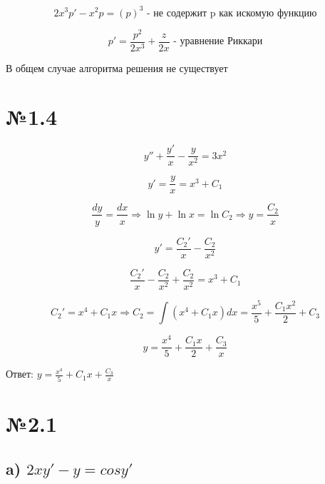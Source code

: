 \documentclass{article}
\begin{document}
\begin{equation*}
    2x^3p' - x^2p = (p)^3 \text{ - не содержит p как искомую функцию}
\end{equation*}

\begin{equation*}
    p' = \frac{p^2}{2x^3} + \frac{z}{2x} \text{ - уравнение Риккари}
\end{equation*}

В общем случае алгоритма решения не существует

\section*{№1.4}

\begin{equation*}
    y'' + \frac{y'}{x} - \frac{y}{x^2} = 3x^2
\end{equation*}

\begin{equation*}
    y' = \frac{y}{x} = x^3 + C_1
\end{equation*}

\begin{equation*}
    \frac{dy}{y} = \frac{dx}{x} \Rightarrow \ln{y} + \ln{x} = \ln{C_2} \Rightarrow y = \frac{C_2}{x}
\end{equation*}

\begin{equation*}
    y' = \frac{C_2'}{x} - \frac{C_2}{x^2}
\end{equation*}

\begin{equation*}
    \frac{C_2'}{x} - \frac{C_2}{x^2} + \frac{C_2}{x^2} = x^3 + C_1
\end{equation*}

\begin{equation*}
    C_2' = x^4 + C_1x \Rightarrow  C_2 = \int{(x^4 + C_1x)dx} = \frac{x^5}{5} + \frac{C_1x^2}{2} + C_3
\end{equation*}

\begin{equation*}
    y = \frac{x^4}{5} + \frac{C_1x}{2} + \frac{C_3}{x}
\end{equation*}

Ответ: $
y = \frac{x^4}{5} + C_1x + \frac{C_3}{x}
$
\section*{№2.1}
\subsection*{a) $ 2xy' - y = cosy'$}
\end{document}
